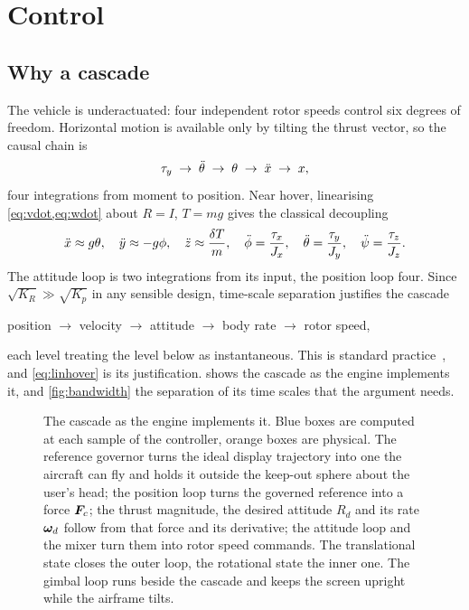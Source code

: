 ﻿\section{Control}
\label{sec:control}

\subsection{Why a cascade}

The vehicle is underactuated: four independent rotor speeds control six
degrees of freedom. Horizontal motion is available only by tilting the thrust
vector, so the causal chain is
\begin{equation}
  \tau_y \;\to\; \ddot{\theta} \;\to\; \theta \;\to\; \ddot{x} \;\to\; x ,
  \label{eq:chain}
\end{equation}
four integrations from moment to position. Near hover, linearising
\cref{eq:vdot,eq:wdot} about $R=I$, $T=mg$ gives the classical decoupling
\begin{equation}
  \ddot{x}\approx g\theta,\quad
  \ddot{y}\approx -g\phi,\quad
  \ddot{z}\approx \frac{\delta T}{m},\quad
  \ddot{\phi} = \frac{\tau_x}{J_x},\quad
  \ddot{\theta} = \frac{\tau_y}{J_y},\quad
  \ddot{\psi} = \frac{\tau_z}{J_z} .
  \label{eq:linhover}
\end{equation}
The attitude loop is two integrations from its input, the position loop four.
Since $\sqrt{K_R}\gg\sqrt{K_p}$ in any sensible design, time-scale separation
justifies the cascade

\begin{center}
position $\to$ velocity $\to$ attitude $\to$ body rate $\to$ rotor speed,
\end{center}

each level treating the level below as instantaneous. This is standard
practice~\cite{mahony2012}, and \cref{eq:linhover} is its justification.
 shows the cascade as the engine implements it, and
\cref{fig:bandwidth} the separation of its time scales that the argument
needs.

\begin{figure}[tbp]
\centering

\caption{The cascade as the engine implements it. Blue boxes are computed at
each sample of the controller, orange boxes are physical. The reference
governor turns the ideal display trajectory into one the aircraft can fly and
holds it outside the keep-out sphere about the user's head; the position loop
turns the governed reference into a force $\bm{F}_c$; the thrust magnitude,
the desired attitude $R_d$ and its rate $\bm{\omega}_d$ follow from that force
and its derivative; the attitude loop and the mixer turn them into rotor speed
commands. The translational state closes the outer loop, the rotational state
the inner one. The gimbal loop runs beside the cascade and keeps the screen
upright while the airframe tilts.}
\label{fig:cascade}
\end{figure}

